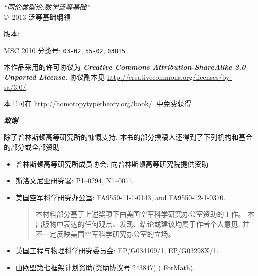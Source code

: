 \hbox{}
\vfill

{\small
\noindent
\emph{``同伦类型论:数学泛等基础''}\\
\copyright\ 2013 泛等基础纲领

\medskip
\noindent
版本: \texttt{\OPTversion}

\medskip
\noindent
MSC 2010 分类号:
\texttt{03-02},
\texttt{55-02},
\texttt{03B15}

\bigskip
\footnotesize

\noindent
本作品采用的许可协议为
\textbf{\emph{Creative Commons Attribution-ShareAlike 3.0 Unported License.}}
%
协议副本见
\url{http://creativecommons.org/licenses/by-sa/3.0/}.

\bigskip

\noindent
本书可在 \url{http://homotopytypetheory.org/book/}. 中免费获得

\bigskip

\noindent
\emph{\textbf{\small 致谢}}

\medskip

\noindent
除了普林斯顿高等研究所的慷慨支持, 本书的部分撰稿人还得到了下列机构和基金的部分或全部资助
%
\begin{itemize}
\item 普林斯顿高等研究所成员协会: 向普林斯顿高等研究院提供资助 %
\item 斯洛文尼亚研究署:  %
\href{http://www.sicris.si/search/prg.aspx?id=6120}{P1--0294},
\href{http://www.sicris.si/search/prj.aspx?id=7109}{N1--0011}.

\item 美国空军科学研究办公室:
  FA9550-11-1-0143, and %
  FA9550-12-1-0370.  %
  {
    \setlength{\parskip}{0pt}
    \begin{quote}
      \noindent\scriptsize
      本材料部分基于上述奖项下由美国空军科学研究办公室资助的工作。
      本出版物中表达的任何观点、发现、结论或建议均属于作者个人意见, 并不一定反映美国空军科学研究办公室的立场。
    \end{quote}
  }

\item 英国工程与物理科学研究委员会: %
   \href{http://gow.epsrc.ac.uk/NGBOViewGrant.aspx?GrantRef=EP/G034109/1}{EP/G034109/1}, %
   \href{http://gow.epsrc.ac.uk/NGBOViewGrant.aspx?GrantRef=EP/G03298X/1}{EP/G03298X/1}. %

\item 由欧盟第七框架计划资助(资助协议号 243847) (%
\href{http://wiki.portal.chalmers.se/cse/pmwiki.php/ForMath/ForMath/}{ForMath}). %


\end{itemize}}
